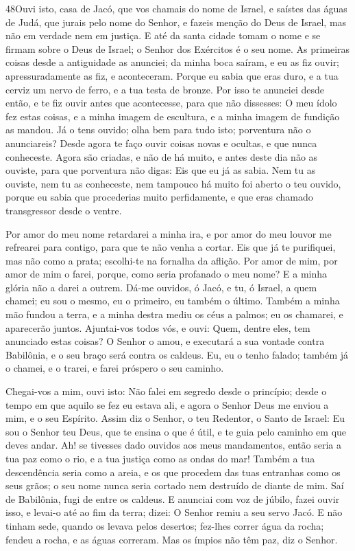 \lettrine{48}{}Ouvi isto, casa de Jacó, que vos chamais do nome
de Israel, e saístes das águas de Judá, que jurais pelo nome do
Senhor, e fazeis menção do Deus de Israel, mas não em verdade nem em
justiça. E até da santa cidade tomam o nome e se firmam sobre o
Deus de Israel; o Senhor dos Exércitos é o seu nome. As
primeiras coisas desde a antiguidade as anunciei; da minha boca
saíram, e eu as fiz ouvir; apressuradamente as fiz, e aconteceram.
Porque eu sabia que eras duro, e a tua cerviz um nervo de ferro,
e a tua testa de bronze. Por isso te anunciei desde então, e te
fiz ouvir antes que acontecesse, para que não dissesses: O meu ídolo
fez estas coisas, e a minha imagem de escultura, e a minha imagem de
fundição as mandou. Já o tens ouvido; olha bem para tudo isto;
porventura não o anunciareis? Desde agora te faço ouvir coisas novas
e ocultas, e que nunca conheceste. Agora são criadas, e não de
há muito, e antes deste dia não as ouviste, para que porventura não
digas: Eis que eu já as sabia. Nem tu as ouviste, nem tu as
conheceste, nem tampouco há muito foi aberto o teu ouvido, porque eu
sabia que procederias muito perfidamente, e que eras chamado
transgressor desde o ventre.

Por amor do meu nome retardarei a minha ira, e por amor do meu
louvor me refrearei para contigo, para que te não venha a cortar.
Eis que já te purifiquei, mas não como a prata; escolhi-te na
fornalha da aflição. Por amor de mim, por amor de mim o
farei, porque, como seria profanado o meu nome? E a minha glória não
a darei a outrem. Dá-me ouvidos, ó Jacó, e tu, ó Israel, a
quem chamei; eu sou o mesmo, eu o primeiro, eu também o último.
Também a minha mão fundou a terra, e a minha destra mediu os
céus a palmos; eu os chamarei, e aparecerão juntos.
Ajuntai-vos todos vós, e ouvi: Quem, dentre eles, tem
anunciado estas coisas? O Senhor o amou, e executará a sua vontade
contra Babilônia, e o seu braço será contra os caldeus. Eu,
eu o tenho falado; também já o chamei, e o trarei, e farei próspero
o seu caminho.

Chegai-vos a mim, ouvi isto: Não falei em segredo desde o
princípio; desde o tempo em que aquilo se fez eu estava ali, e agora
o Senhor Deus me enviou a mim, e o seu Espírito. Assim diz o
Senhor, o teu Redentor, o Santo de Israel: Eu sou o Senhor teu Deus,
que te ensina o que é útil, e te guia pelo caminho em que deves
andar. Ah! se tivesses dado ouvidos aos meus mandamentos,
então seria a tua paz como o rio, e a tua justiça como as ondas do
mar! Também a tua descendência seria como a areia, e os que
procedem das tuas entranhas como os seus grãos; o seu nome nunca
seria cortado nem destruído de diante de mim. Saí de
Babilônia, fugi de entre os caldeus. E anunciai com voz de júbilo,
fazei ouvir isso, e levai-o até ao fim da terra; dizei: O Senhor
remiu a seu servo Jacó. E não tinham sede, quando os levava
pelos desertos; fez-lhes correr água da rocha; fendeu a rocha, e as
águas correram. Mas os ímpios não têm paz, diz o Senhor.

